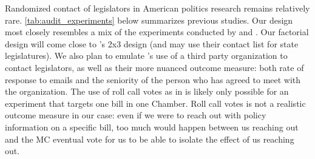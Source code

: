 \documentclass[12pt,final,fleqn]{article}
\theoremstyle{plain}
\begin{document}
Randomized contact of legislators in American politics research remains relatively rare. \autoref{tab:audit_experiments} below summarizes previous studies. Our design most closely resembles a mix of the experiments conducted by \citet{butler2011politicians} and \citet{kalla2016campaign}. Our factorial design will come close to \citet{butler2011politicians}'s 2x3 design (and may use their contact list for state legislatures). We also plan to emulate \citet{kalla2016campaign}'s use of a third party organization to contact legislators, as well as their more nuanced outcome measure: both rate of response to emails and the seniority of the person who has agreed to meet with the organization. The use of roll call votes as in \citet{bergan2009does} is likely only possible for an experiment that targets one bill in one Chamber. Roll call votes is not a realistic outcome measure in our case: even if we were to reach out with policy information on a specific bill, too much would happen between us reaching out and the MC eventual vote for us to be able to isolate the effect of us reaching out. 
\end{document}
